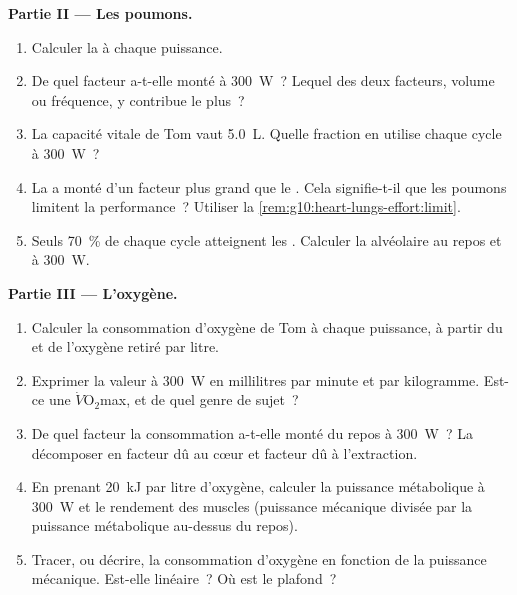 \begin{problem}
\medskip
\noindent\textbf{Partie II --- Les poumons.}
\begin{enumerate}[resume]
  \item Calculer la  à chaque puissance.
  \item De quel facteur a-t-elle monté à \qty{300}{W}~? Lequel des deux
        facteurs, volume ou fréquence, y contribue le plus~?
  \item La capacité vitale de Tom vaut \qty{5.0}{L}. Quelle fraction en
        utilise chaque cycle à \qty{300}{W}~?
  \item La  a monté d'un facteur plus grand que le . Cela signifie-t-il que les poumons limitent la
        performance~? Utiliser la
        \cref{rem:g10:heart-lungs-effort:limit}.
  \item Seuls 70~\% de chaque cycle atteignent les . Calculer
        la  alvéolaire au repos et à \qty{300}{W}.
\end{enumerate}

\medskip
\noindent\textbf{Partie III --- L'oxygène.}
\begin{enumerate}[resume]
  \item Calculer la consommation d'oxygène de Tom à chaque puissance,
        à partir du  et de l'oxygène retiré par litre.
  \item Exprimer la valeur à \qty{300}{W} en millilitres par minute et
        par kilogramme. Est-ce une $\dot V\!\mathrm{O_2}$max, et de
        quel genre de sujet~?
  \item De quel facteur la consommation a-t-elle monté du repos à
        \qty{300}{W}~? La décomposer en facteur dû au cœur et facteur
        dû à l'extraction.
  \item En prenant \qty{20}{kJ} par litre d'oxygène, calculer la
        puissance métabolique à \qty{300}{W} et le rendement des
        muscles (puissance mécanique divisée par la puissance
        métabolique au-dessus du repos).
  \item Tracer, ou décrire, la consommation d'oxygène en fonction de
        la puissance mécanique. Est-elle linéaire~? Où est le plafond~?
\end{enumerate}


\end{problem}
